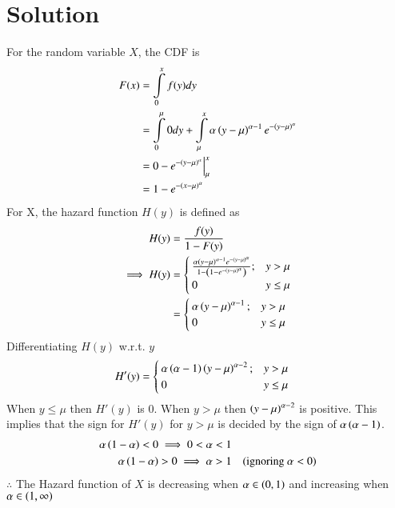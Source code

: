 \documentclass[journal,12pt,twocolumn]{IEEEtran}
\begin{document}
\section*{Solution}
\newcommand{\Integral}[2]{\ensuremath{\int\limits_{#1}^{#2}}}
For the random variable $X$, the CDF is
\begin{align}
    F(x)&=\Integral{0}{x}f(y)dy\\
        &=\Integral{0}{\mu}0 dy +\Integral{\mu}{x}\alpha\brak{y-\mu}^{\alpha -1}e^{-\brak{y-\mu}^\alpha}\\
        &=0 -e^{-\brak{y-\mu}^\alpha}\Big|_{\mu}^{x}\\
        &=1-e^{-\brak{x-\mu}^{\alpha}}
\end{align}
For X, the hazard function $H(y)$ is defined as
\begin{align}
    H(y)&=\frac{f(y)}{1-F(y)}\nonumber\\
    \implies H(y)&=\begin{cases}\frac{\alpha\left(y-\mu\right)^{\alpha -1}e^{-\left(y-\mu\right)^\alpha}}{1-\left(1-e^{-\left(y-\mu\right)^{\alpha}}\right)};&y>\mu\\
                        0                               &y\leq\mu   
    \end{cases}\nonumber\\
    &=\begin{cases}\alpha\left(y-\mu\right)^{\alpha -1};&y>\mu\\
                        0                            &y\leq\mu   
    \end{cases}\nonumber
\end{align}
Differentiating $H(y)$ w.r.t. $y$
\begin{align}
    H'(y)&=\begin{cases}\alpha\left(\alpha - 1\right)\left(y-\mu\right)^{\alpha -2};&y>\mu\\
                        0                            &y\leq\mu   
    \end{cases}\nonumber
\end{align}
When $y\leq \mu$ then $H'(y)$ is $0$. When $y>\mu$ then $\left(y-\mu\right)^{\alpha -2}$ is positive. This implies that the sign for $H'(y)$ for $y>\mu$ is decided by the sign of $\alpha\left(\alpha -1\right)$.
\begin{align}
    \alpha\left(1-\alpha\right)<0
    \implies 0<\alpha<1\nonumber\\
    \alpha\left(1-\alpha\right)>0\implies \alpha>1 &&\text{(ignoring $\alpha<0$)}\nonumber
\end{align}
$\therefore$ The Hazard function of $X$ is decreasing when $\alpha \in \left(0,1\right)$ and increasing when $\alpha \in \left(1,\infty\right)$
\end{document}

